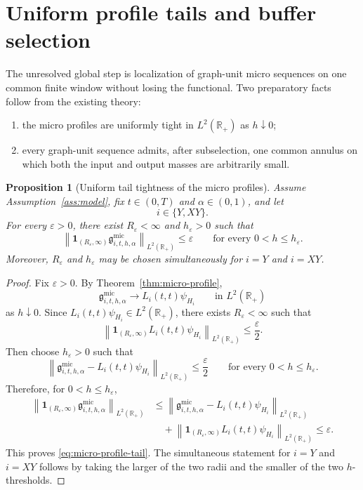 \documentclass[11pt,a4paper]{amsart}
\theoremstyle{plain}
\newtheorem{proposition}[theorem]{Proposition}
\theoremstyle{definition}
\theoremstyle{remark}
\newcommand{\R}{\mathbb{R}}
\newcommand{\one}{\mathbf 1}
\begin{document}
\section{Uniform profile tails and buffer selection}
\label{sec:good-buffers}

The unresolved global step is localization of graph-unit micro sequences on one common finite
window without losing the functional.  Two preparatory facts follow from the existing theory:
\begin{enumerate}[label=(\roman*)]
\item the micro profiles are uniformly tight in \(L^2(\R_+)\) as \(h\downarrow0\);
\item every graph-unit sequence admits, after subselection, one common annulus on which both the
input and output masses are arbitrarily small.
\end{enumerate}

\begin{proposition}[Uniform tail tightness of the micro profiles]
\label{prop:micro-profile-tails}
Assume Assumption~\ref{ass:model}, fix \(t\in(0,T)\) and \(\alpha\in(0,1)\), and let
\[
i\in\{Y,XY\}.
\]
For every \(\varepsilon>0\), there exist \(R_\varepsilon<\infty\) and \(h_\varepsilon>0\) such that
\begin{equation}\label{eq:micro-profile-tail}
\left\|
\one_{(R_\varepsilon,\infty)}
\mathfrak g_{i,t,h,\alpha}^{\mathrm{mic}}
\right\|_{L^2(\R_+)}
\le
\varepsilon
\qquad\text{for every }0<h\le h_\varepsilon.
\end{equation}
Moreover, \(R_\varepsilon\) and \(h_\varepsilon\) may be chosen simultaneously for \(i=Y\) and
\(i=XY\).
\end{proposition}

\begin{proof}
Fix \(\varepsilon>0\). By Theorem~\ref{thm:micro-profile},
\[
\mathfrak g_{i,t,h,\alpha}^{\mathrm{mic}}
\longrightarrow
L_i(t,t)\psi_{H_i}
\qquad\text{in }L^2(\R_+)
\]
as \(h\downarrow0\). Since \(L_i(t,t)\psi_{H_i}\in L^2(\R_+)\), there exists \(R_\varepsilon<\infty\)
such that
\[
\left\|
\one_{(R_\varepsilon,\infty)}L_i(t,t)\psi_{H_i}
\right\|_{L^2(\R_+)}
\le
\frac{\varepsilon}{2}.
\]
Then choose \(h_\varepsilon>0\) such that
\[
\left\|
\mathfrak g_{i,t,h,\alpha}^{\mathrm{mic}}-L_i(t,t)\psi_{H_i}
\right\|_{L^2(\R_+)}
\le
\frac{\varepsilon}{2}
\qquad\text{for every }0<h\le h_\varepsilon.
\]
Therefore, for \(0<h\le h_\varepsilon\),
\begin{align*}
\left\|
\one_{(R_\varepsilon,\infty)}
\mathfrak g_{i,t,h,\alpha}^{\mathrm{mic}}
\right\|_{L^2(\R_+)}
&\le
\left\|
\mathfrak g_{i,t,h,\alpha}^{\mathrm{mic}}-L_i(t,t)\psi_{H_i}
\right\|_{L^2(\R_+)}\\
&\quad+
\left\|
\one_{(R_\varepsilon,\infty)}L_i(t,t)\psi_{H_i}
\right\|_{L^2(\R_+)}
\le
\varepsilon.
\end{align*}
This proves \eqref{eq:micro-profile-tail}. The simultaneous statement for \(i=Y\) and \(i=XY\)
follows by taking the larger of the two radii and the smaller of the two \(h\)-thresholds.
\end{proof}
\end{document}
